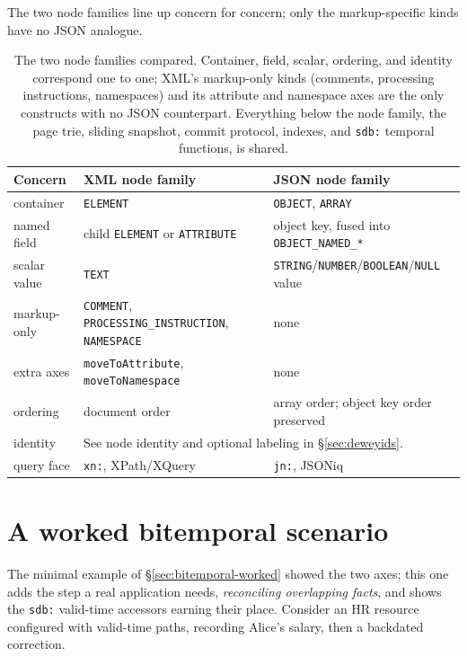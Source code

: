 \documentclass[11pt,a4paper,oneside]{report}
\theoremstyle{sirixthm}
\newcommand{\code}[1]{\texttt{#1}}
\begin{document}
The two node families line up concern for concern; only the markup-specific kinds have no JSON analogue.

\begin{table}[h]
\centering\small\setlength{\tabcolsep}{6pt}\renewcommand{\arraystretch}{1.25}
\begin{tabularx}{\linewidth}{@{}l X X@{}}
\toprule
\textbf{Concern} & \textbf{XML node family} & \textbf{JSON node family}\\
\midrule
container & \code{ELEMENT} & \code{OBJECT}, \code{ARRAY}\\
named field & child \code{ELEMENT} or \code{ATTRIBUTE} & object key, fused into \code{OBJECT\_NAMED\_*}\\
scalar value & \code{TEXT} & \code{STRING}/\code{NUMBER}/\code{BOOLEAN}/\code{NULL} value\\
markup-only & \code{COMMENT}, \code{PROCESSING\_INSTRUCTION}, \code{NAMESPACE} & none\\
extra axes & \code{moveToAttribute}, \code{moveToNamespace} & none\\
ordering & document order & array order; object key order preserved\\
identity & \multicolumn{2}{l}{See node identity and optional labeling in \S\ref{sec:deweyids}.}\\
query face & \code{xn:}, XPath/XQuery & \code{jn:}, JSONiq\\
\bottomrule
\end{tabularx}
\caption{The two node families compared. Container, field, scalar, ordering, and identity correspond one
to one; XML's markup-only kinds (comments, processing instructions, namespaces) and its attribute and
namespace axes are the only constructs with no JSON counterpart. Everything below the node family, the
page trie, sliding snapshot, commit protocol, indexes, and \code{sdb:} temporal functions, is shared.}
\label{tab:nodefamilies}
\end{table}

\section{A worked bitemporal scenario}
\label{app:bitemporal-scenario}

The minimal example of \S\ref{sec:bitemporal-worked} showed the two axes; this one adds the step a real
application needs, \emph{reconciling overlapping facts}, and shows the \code{sdb:} valid-time accessors
earning their place. Consider an HR resource configured with valid-time paths, recording Alice's salary,
then a backdated correction.
\end{document}
